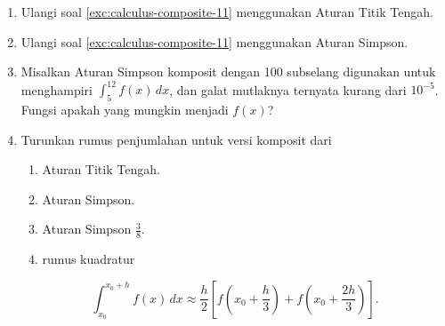 \begin{enumerate}
dapat dihampiri dengan galat tidak lebih dari $10^{-4}$ menggunakan
Aturan Trapesium \textit{komposit}. CATATAN: $\int_{0}^{\pi}\sin^{4}x\,dx=\frac{3}{8}\pi$. \hasasolution 
\item \label{exc:calculus-composite-14}Ulangi soal \ref{exc:calculus-composite-11}
menggunakan Aturan Titik Tengah. \hasananswer 
\item Ulangi soal \ref{exc:calculus-composite-11} menggunakan Aturan Simpson.
\item Misalkan Aturan Simpson komposit dengan 100 subselang digunakan untuk
menghampiri $\int_{5}^{12}f(x)\,dx$, dan galat mutlaknya ternyata
kurang dari $10^{-5}$. Fungsi apakah yang mungkin menjadi $f(x)$?
\item Turunkan rumus penjumlahan untuk versi komposit dari

\begin{enumerate}
\item Aturan Titik Tengah.
\item \label{exc:calculus-composite-15}Aturan Simpson. \hasananswer 
\item \label{exc:calculus-composite-16}Aturan Simpson $\frac{3}{8}$. \hasananswer 
\item rumus kuadratur
\end{enumerate}
\[
\int_{x_{0}}^{x_{0}+h}f(x)\,dx\approx\frac{h}{2}\left[f\left(x_{0}+\frac{h}{3}\right)+f\left(x_{0}+\frac{2h}{3}\right)\right].
\]


\end{enumerate}
